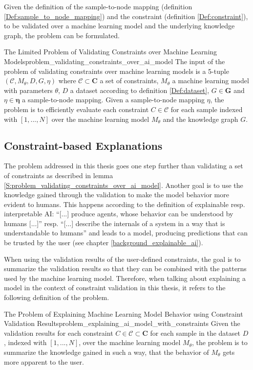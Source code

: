 Given the definition of the sample-to-node mapping (definition \ref{Def:sample_to_node_mapping}) and the constraint (definition \ref{Def:constraint}), to be validated over a machine learning model and the underlying knowledge graph, the problem can be formulated. 

\begin{Satz}{The Limited Problem of Validating Constraints over Machine Learning Models}{problem_validating_constraints_over_ai_model}
The input of the problem of validating constraints over machine learning models is a 5-tuple $(\mathcal{C}, M_\theta, D, G, \eta)$ where $\mathcal{C} \subset \mathbf{C}$ a set of constraints, $M_\theta$ a machine learning model with parameters $\theta$, $D$ a dataset according to definition \ref{Def:dataset}, $G \in \mathbf{G}$ and $\eta \in \boldsymbol{\eta}$ a sample-to-node mapping. Given a sample-to-node mapping $\eta$, the problem is to efficiently evaluate each constraint $C \in \mathcal{C}$ for each sample indexed with $[1,...,N]$ over the machine learning model $M_\theta$ and the knowledge graph $G$.
\end{Satz}

\subsection{Constraint-based Explanations}
The problem addressed in this thesis goes one step further than validating a set of constraints as described in lemma \ref{S:problem_validating_constraints_over_ai_model}. Another goal is to use the knowledge gained through the validation to make the model behavior more evident to humans. This happens according to the definition of explainable resp. interpretable AI: ``[...] produce agents, whose behavior can be understood by humans [...]'' resp. ``[...] describe the internals of a system in a way that is understandable to humans'' and leads to a model, producing predictions that can be trusted by the user (see chapter \ref{background_explainable_ai}).

When using the validation results of the user-defined constraints, the goal is to summarize the validation results so that they can be combined with the patterns used by the machine learning model. Therefore, when talking about explaining a model in the context of constraint validation in this thesis, it refers to the following definition of the problem.

\begin{Satz}{The Problem of Explaining Machine Learning Model Behavior using Constraint Validation Results}{problem_explaining_ai_model_with_constraints}
Given the validation results for each constraint $C \in \mathcal{C} \subset \mathbf{C}$ for each sample in the dataset $D$, indexed with $[1,...,N]$, over the machine learning model $M_\theta$, the problem is to summarize the knowledge gained in such a way, that the behavior of $M_\theta$ gets more apparent to the user. 
\end{Satz}



